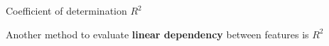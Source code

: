 \documentclass[11pt,compress,t,notes=noshow, aspectratio=169, xcolor=table]{beamer}
\begin{document}
\begin{frame}{Coefficient of determination $R^2$}

Another method to evaluate \textbf{linear dependency} between features is $R^2$

\begin{columns}[c, totalwidth=\textwidth]
\begin{column}{0.5\linewidth}

\end{column}
\end{columns}
\end{frame}
\end{document}
